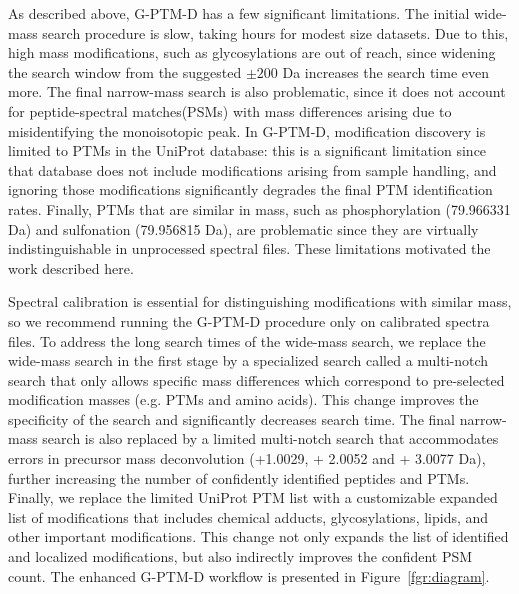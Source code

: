 \documentclass[journal=jprobs,manuscript=article]{achemso}
\begin{document}
As described above, G-PTM-D has a few significant limitations.
The initial wide-mass search procedure is slow, taking hours for modest size datasets.
Due to this, high mass modifications, such as glycosylations are out of reach, since widening the search window from the suggested $\pm 200$ Da increases the search time even more.
The final narrow-mass search is also problematic, since it does not account for peptide-spectral matches(PSMs) with mass differences arising due to misidentifying the monoisotopic peak.
In G-PTM-D, modification discovery is limited to PTMs in the UniProt database: this is a significant limitation since that database does not include modifications arising from sample handling, and ignoring those modifications significantly degrades the final PTM identification rates.
Finally, PTMs that are similar in mass, such as phosphorylation (79.966331 Da) and sulfonation (79.956815 Da), are problematic since they are virtually indistinguishable in unprocessed spectral files.
These limitations motivated the work described here.

Spectral calibration is essential for distinguishing modifications with similar mass, so we recommend running the G-PTM-D procedure only on calibrated spectra files.
To address the long search times of the wide-mass search, we replace the wide-mass search in the first stage by a specialized search called a multi-notch search that only allows specific mass differences which correspond to pre-selected modification masses (e.g. PTMs and amino acids).
This change improves the specificity of the search and significantly decreases search time.
The final narrow-mass search is also replaced by a limited multi-notch search that accommodates errors in precursor mass deconvolution (+1.0029, + 2.0052 and + 3.0077 Da), further increasing the number of confidently identified peptides and PTMs.
Finally, we replace the limited UniProt PTM list with a customizable expanded list of modifications that includes chemical adducts, glycosylations, lipids, and other important modifications.
This change not only expands the list of identified and localized modifications, but also indirectly improves the confident PSM count.
The enhanced G-PTM-D workflow is presented in Figure~\ref{fgr:diagram}.
\end{document}
